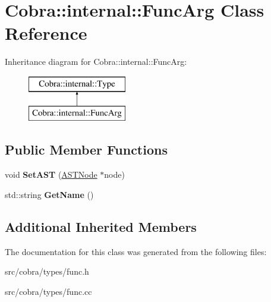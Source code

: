 \hypertarget{class_cobra_1_1internal_1_1_func_arg}{\section{Cobra\+:\+:internal\+:\+:Func\+Arg Class Reference}
\label{class_cobra_1_1internal_1_1_func_arg}
}
Inheritance diagram for Cobra\+:\+:internal\+:\+:Func\+Arg\+:\begin{figure}[H]
\begin{center}
\leavevmode
\includegraphics[height=2.000000cm]{class_cobra_1_1internal_1_1_func_arg}
\end{center}
\end{figure}
\subsection*{Public Member Functions}
\begin{DoxyCompactItemize}
\item 
\hypertarget{class_cobra_1_1internal_1_1_func_arg_a3b97b7e3e26ee3f66e33b0f9502e6ca7}{void {\bfseries Set\+A\+S\+T} (\hyperlink{class_cobra_1_1internal_1_1_a_s_t_node}{A\+S\+T\+Node} $\ast$node)}\label{class_cobra_1_1internal_1_1_func_arg_a3b97b7e3e26ee3f66e33b0f9502e6ca7}

\item 
\hypertarget{class_cobra_1_1internal_1_1_func_arg_a6e50a77453b1b6dda5646863d1c802cd}{std\+::string {\bfseries Get\+Name} ()}\label{class_cobra_1_1internal_1_1_func_arg_a6e50a77453b1b6dda5646863d1c802cd}

\end{DoxyCompactItemize}
\subsection*{Additional Inherited Members}


The documentation for this class was generated from the following files\+:\begin{DoxyCompactItemize}
\item 
src/cobra/types/func.\+h\item 
src/cobra/types/func.\+cc\end{DoxyCompactItemize}
